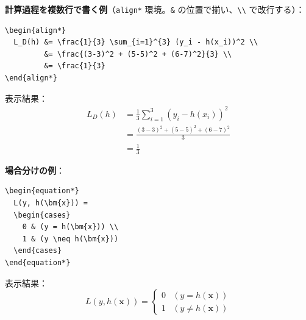 \documentclass[a4paper,dvipdfmx]{jsarticle}
\newcommand{\学籍番号}{0000000}
\newcommand{\氏名}{氏名を書く}
\newcommand{\提出日}{2026年10月1日}
\begin{document}
\noindent
\textbf{計算過程を複数行で書く例}（\verb|align*| 環境。\verb|&| の位置で揃い、\verb|\\| で改行する）：
\begin{verbatim}
\begin{align*}
  L_D(h) &= \frac{1}{3} \sum_{i=1}^{3} (y_i - h(x_i))^2 \\
         &= \frac{(3-3)^2 + (5-5)^2 + (6-7)^2}{3} \\
         &= \frac{1}{3}
\end{align*}
\end{verbatim}
表示結果：
\begin{align*}
  L_D(h) &= \frac{1}{3} \sum_{i=1}^{3} (y_i - h(x_i))^2 \\
         &= \frac{(3-3)^2 + (5-5)^2 + (6-7)^2}{3} \\
         &= \frac{1}{3}
\end{align*}

\noindent
\textbf{場合分けの例}：
\begin{verbatim}
\begin{equation*}
  L(y, h(\bm{x})) =
  \begin{cases}
    0 & (y = h(\bm{x})) \\
    1 & (y \neq h(\bm{x}))
  \end{cases}
\end{equation*}
\end{verbatim}
表示結果：
\begin{equation*}
  L(y, h(\bm{x})) =
  \begin{cases}
    0 & (y = h(\bm{x})) \\
    1 & (y \neq h(\bm{x}))
  \end{cases}
\end{equation*}
\end{document}

